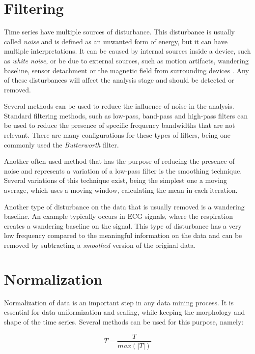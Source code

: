 \section{Filtering}
\label{subsubsec:filt}

Time series have multiple sources of disturbance. This disturbance is usually called \textit{noise} and is defined as an unwanted form of energy, but it can have multiple interpretations. It can be caused by internal sources inside a device, such as \textit{white noise}, or be due to external sources, such as motion artifacts, wandering baseline, sensor detachment or the magnetic field from surrounding devices \cite{}. Any of these disturbances will affect the analysis stage and should be detected or removed.
\par
Several methods can be used to reduce the influence of noise in the analysis. Standard filtering methods, such as low-pass, band-pass and high-pass filters can be used to reduce the presence of specific frequency bandwidths that are not relevant. There are many configurations for these types of filters, being one commonly used the \textit{Butterworth} filter.

Another often used method that has the purpose of reducing the presence of noise and represents a variation of a low-pass filter is the smoothing technique. Several variations of this technique exist, being the simplest one a moving average, which uses a moving window, calculating the mean in each iteration.

Another type of disturbance on the data that is usually removed is a wandering baseline. An example typically occurs in ECG signals, where the respiration creates a wandering baseline on the signal. This type of disturbance has a very low frequency compared to the meaningful information on the data and can be removed by subtracting a \textit{smoothed} version of the original data.

\section{Normalization} 
\label{subsec:normalize}

Normalization of data is an important step in any data mining process. It is essential for data uniformization and scaling, while keeping the morphology and shape of the time series. Several methods can be used for this purpose, namely:

\begin{equation}
\overline{T} = \frac{T}{max(|T|)}
\end{equation}

